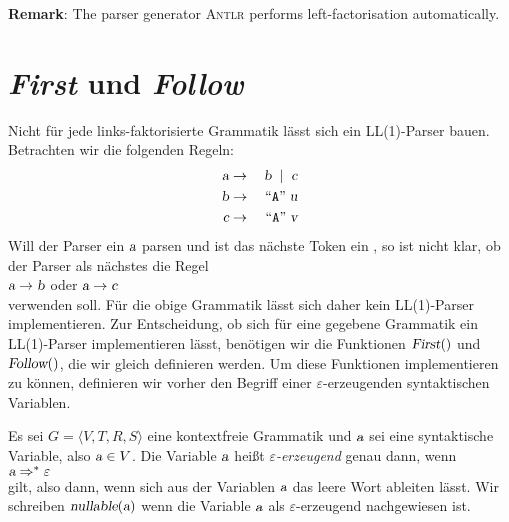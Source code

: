 \noindent
\textbf{Remark}: The parser generator \textsc{Antlr} performs left-factorisation automatically.


\section{\textsl{First} und \textsl{Follow}}
Nicht f\"ur jede links-faktorisierte Grammatik l\"asst sich ein LL(1)-Parser bauen.  Betrachten
wir die folgenden Regeln:
\begin{eqnarray*}
  \textsl{a} & \rightarrow & \textsl{b} \; \mid\; \textsl{c} \\
  \textsl{b} & \rightarrow & \;\mbox{``\texttt{A}''}\; \textsl{u}  \\
  \textsl{c} & \rightarrow & \;\mbox{``\texttt{A}''}\; \textsl{v}  
\end{eqnarray*}
Will der Parser ein $\textsl{a}$ parsen und ist das n\"achste Token ein , so ist nicht klar,
ob der Parser als n\"achstes die Regel
\\[0.2cm]
\hspace*{1.3cm}
$\textsl{a} \rightarrow \textsl{b}$ \quad oder \quad $\textsl{a} \rightarrow \textsl{c}$
\\[0.2cm]
verwenden soll.  F\"ur die obige Grammatik l\"asst sich daher kein LL(1)-Parser implementieren.
Zur Entscheidung, ob sich f\"ur eine gegebene Grammatik ein LL(1)-Parser implementieren l\"asst,
ben\"otigen wir die Funktionen $\textsl{First}()$ und $\textsl{Follow}()$, die wir gleich
definieren werden.  Um diese Funktionen implementieren zu k\"onnen, definieren wir vorher  den
Begriff einer $\varepsilon$-erzeugenden syntaktischen Variablen.

\begin{Definition}
Es sei $G = \langle V, T, R, S \rangle$ eine kontextfreie Grammatik und $\textsl{a}$ sei eine
syntaktische Variable, also $\textsl{a} \in V$.  Die Variable $\textsl{a}$ hei{\ss}t 
\emph{$\varepsilon$-erzeugend} genau dann, wenn
\\[0.2cm]
\hspace*{1.3cm}
$\textsl{a} \Rightarrow^* \varepsilon$
\\[0.2cm]
gilt, also dann, wenn sich aus der Variablen $\textsl{a}$ das leere Wort ableiten l\"asst. 
Wir schreiben $\textsl{nullable}(\textsl{a})$ wenn die Variable $\textsl{a}$ als $\varepsilon$-erzeugend
nachgewiesen ist.
\eox
\end{Definition}

